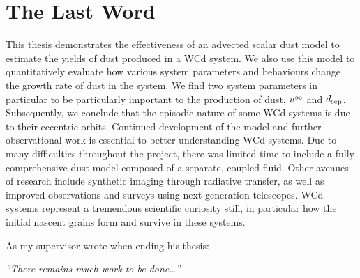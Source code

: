 \section{The Last Word}

This thesis demonstrates the effectiveness of an advected scalar dust model to estimate the yields of dust produced in a WCd system.
We also use this model to quantitatively evaluate how various system parameters and behaviours change the growth rate of dust in the system.
We find two system parameters in particular to be particularly important to the production of dust, $v^\infty$ and $d_\text{sep}$.
Subsequently, we conclude that the episodic nature of some WCd systems is due to their eccentric orbits.
Continued development of the model and further observational work is essential to better understanding WCd systems.
Due to many difficulties throughout the project, there was limited time to include a fully comprehensive dust model composed of a separate, coupled fluid.
Other avenues of research include synthetic imaging through radiative transfer, as well as improved observations and surveys using next-generation telescopes.
WCd systems represent a tremendous scientific curiosity still, in particular how the initial nascent grains form and survive in these systems.

As my supervisor wrote when ending his thesis:

\begin{center}
  \emph{``There remains much work to be done\ldots''}
\end{center}